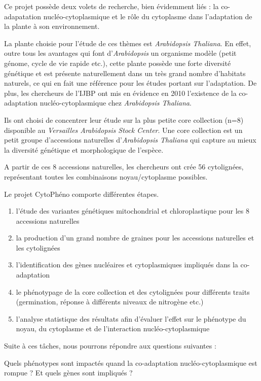 \documentclass[a4paper]{article}
\begin{document}
Ce projet possède deux volets de recherche, bien évidemment liés : la co-adapatation nucléo-cytoplasmique et le rôle du cytoplasme dans l'adaptation de la plante à son environnement. 

La plante choisie pour l'étude de ces thèmes est \textit{Arabidopsis Thaliana}. En effet, outre tous les avantages qui font d'\textit{Arabidopsis} un organisme modèle (petit génome, cycle de vie rapide etc.), cette plante possède une forte diversité génétique et est présente naturellement dans un très grand nombre d'habitats naturels, ce qui en fait une référence pour les études portant sur l'adaptation. De plus, les chercheurs de l'IJBP ont mis en évidence en 2010 l'existence de la co-adaptation nucléo-cytoplasmique chez \textit{Arabidopsis Thaliana}.\cite{moison2010cytoplasmic}

Ils ont choisi de concentrer leur étude sur la plus petite core collection (n=8) disponible au \textit{Versailles Arabidopsis Stock Center}. Une core collection est un petit groupe d'accessions naturelles d'\textit{Arabidopsis Thaliana} qui capture au mieux la diversité génétique et morphologique de l'espèce.\cite{mckhann2004nested}

A partir de ces 8 accessions naturelles, les chercheurs ont crée 56 cytolignées, représentant toutes les combinaisons noyau/cytoplasme possibles. 

Le projet CytoPhéno comporte différentes étapes.

\begin{enumerate}
\item l'étude des variantes génétiques mitochondrial et chloroplastique pour les 8 accessions naturelles
\item la production d'un grand nombre de graines pour les accessions naturelles et les cytolignées
\item l'identification des gènes nucléaires et cytoplasmiques impliqués dans la co-adaptation  
\item le phénotypage de la core collection et des cytolignées pour différents traits (germination, réponse à différents niveaux de nitrogène etc.)
\item l'analyse statistique des résultats afin d'évaluer l'effet sur le phénotype du noyau, du cytoplasme et de l'interaction nucléo-cytoplasmique
\end{enumerate}

Suite à ces tâches, nous pourrons répondre aux questions suivantes :  

Quels phénotypes sont impactés quand la co-adaptation nucléo-cytoplasmique est rompue ? Et quels gènes sont impliqués ?
\end{document}
